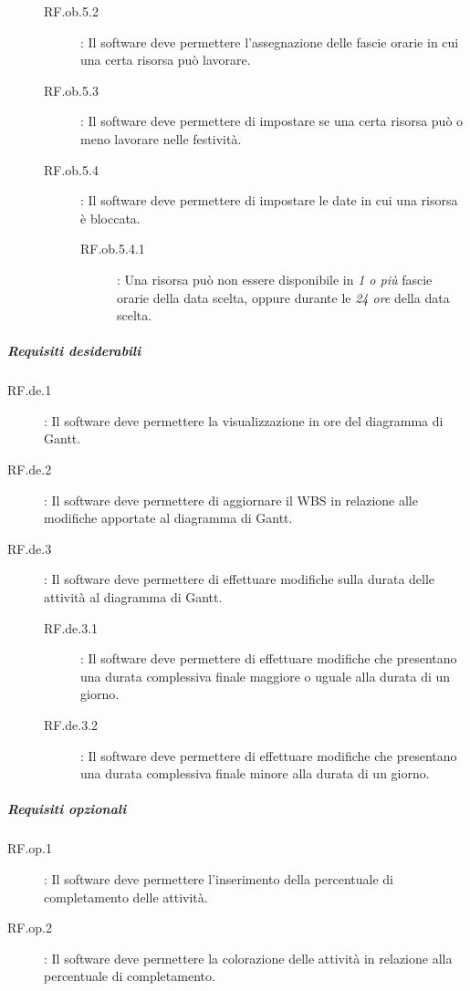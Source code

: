 \begin{description}
\begin{description}
\begin{description}
		\end{description}
	\item[RF.ob.5.2]: Il software deve permettere l\textquoteright{}assegnazione delle fascie orarie in cui una certa risorsa pu\`{o} lavorare.
	\item[RF.ob.5.3]: Il software deve permettere di impostare se una certa risorsa pu\`{o} o meno lavorare nelle festivit\`{a}.
	\item[RF.ob.5.4]: Il software deve permettere di impostare le date in cui una risorsa \`{e} bloccata.
		\begin{description}
		\item[RF.ob.5.4.1]: Una risorsa pu\`{o} non essere disponibile in \textit{1 o pi\`{u}} fascie orarie della data scelta, oppure durante le \textit{24 ore} della data scelta.
		\end{description}
	\end{description}
\end{description}

\subparagraph{Requisiti desiderabili} \quad \quad 

\begin{description}
\item[RF.de.1]: Il software deve permettere la visualizzazione in ore del diagramma di Gantt.
\item[RF.de.2]: Il software deve permettere di aggiornare il WBS in relazione alle modifiche apportate al diagramma di Gantt.
\item[RF.de.3]: Il software deve permettere di effettuare modifiche sulla durata delle attivit\`{a} al diagramma di Gantt.
	\begin{description}
	\item[RF.de.3.1]: Il software deve permettere di effettuare modifiche che presentano una durata complessiva finale maggiore o uguale alla durata di un giorno.
	\item[RF.de.3.2]: Il software deve permettere di effettuare modifiche che presentano una durata complessiva finale minore alla durata di un giorno.
\end{description}
\end{description}

\subparagraph{Requisiti opzionali} \quad \quad 

\begin{description}
\item[RF.op.1]: Il software deve permettere l\textquoteright{}inserimento della percentuale di completamento delle attivit\`{a}.
\item[RF.op.2]: Il software deve permettere la colorazione delle attivit\`{a} in relazione alla percentuale di completamento.
\end{description}

